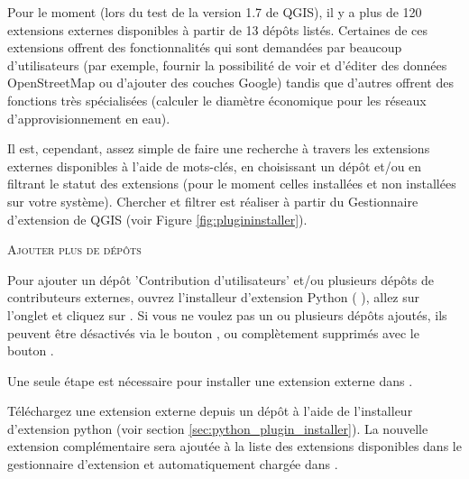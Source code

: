 Pour le moment (lors du test de la version 1.7 de QGIS), il y a plus de 120 extensions 
externes disponibles à partir de 13 dépôts listés. Certaines de ces extensions 
offrent des fonctionnalités qui sont demandées par beaucoup d'utilisateurs (par exemple, fournir la possibilité de voir et d'éditer des données OpenStreetMap ou 
d'ajouter des couches Google) tandis que d'autres offrent des fonctions très 
spécialisées (calculer le diamètre économique pour les réseaux
d'approvisionnement en eau). 

Il est, cependant, assez simple de faire une recherche à travers les extensions externes 
disponibles à l'aide de mots-clés, en choisissant un dépôt et/ou en filtrant le 
statut des extensions (pour le moment celles installées et non installées sur votre 
système). Chercher et filtrer est réaliser à partir du Gestionnaire d'extension de 
QGIS (voir Figure \ref{fig:plugininstaller}).

\begin{Tip} \caption{\textsc{Ajouter plus de dépôts}}
Pour ajouter un dépôt 'Contribution d'utilisateurs' et/ou plusieurs dépôts de 
contributeurs externes, ouvrez l'installeur d'extension Python ( 
\arrow {}), 
allez sur l'onglet  et cliquez sur . 
Si vous ne voulez pas un ou plusieurs dépôts  ajoutés, ils peuvent être désactivés 
via le bouton , ou complètement supprimés avec le bouton 
.
\end{Tip}

Une seule étape est nécessaire pour installer une extension externe dans \qg.

Téléchargez une extension externe depuis un dépôt à l'aide de l'installeur d'extension python (voir section \ref{sec:python_plugin_installer}). 
La nouvelle extension complémentaire sera ajoutée à la liste des extensions 
disponibles dans le gestionnaire d'extension et automatiquement chargée dans \qg.

